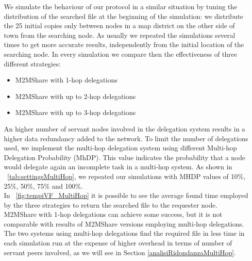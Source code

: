 We simulate the behaviour of our protocol in a similar situation by tuning the distribution of the searched file at the beginning of the simulation: we distribute the 25 initial copies only between nodes in a map district on the other side of town from the searching node. As usually we repeated the simulations several times to get more accurate results, independently from the initial location of the searching node. In every simulation we compare then the effectiveness of three different strategies:
\begin{itemize}
\item M2MShare with 1-hop delegations
\item M2MShare with up to 2-hop delegations
\item M2MShare with up to 3-hop delegations
\end{itemize}


An higher number of servant nodes involved in the delegation system results in a higher data redundancy added to the network. To limit the number of delegations used, we implement the multi-hop delegation system using different Multi-hop Delegation Probability (MhDP). This value indicates the probability that a node would delegate again an incomplete task in a multi-hop system. As shown in \tablename~\ref{tab:settingsMultiHop}, we repeated our simulations with MHDP values of 10\%, 25\%, 50\%, 75\% and 100\%.
\\

In \figurename~\ref{fig:tempiVF_MultiHop} it is possible to see the average found time employed  by the three strategies to return the searched file to the requester node. M2MShare with 1-hop delegations can achieve some success, but it is not comparable with results of M2MShare versions employing multi-hop delegations. The two systems using multi-hop delegations find the required file in less time in each simulation run at the expense of higher overhead in terms of number of servant peers involved, as we will see in Section \ref{analisiRidondanzaMultiHop}.

